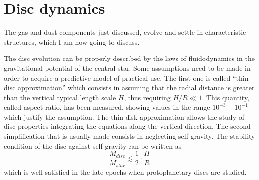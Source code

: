 \documentclass[a4paper,10pt]{report}
\begin{document}
\section{Disc dynamics}

The gas and dust components just discussed, 
evolve and settle in characteristic structures, which I am now going to discuss.

The disc evolution can be properly described by the laws of fluidodynamics in the gravitational potential of the central star.
Some assumptions need to be made in order to acquire a predictive model of practical use.
The first one is called ``thin-disc approximation'' which consists in assuming that the radial distance is greater than 
the vertical typical length scale $H$, thus requiring $H/R \ll 1$. This quantity, called aspect-ratio, has been measured, 
showing values in the range $10^{-3}-10^{-1}$ which justify the assumption. The thin disk approximation allows the study of disc properties integrating
the equations along the vertical direction.
The second simplification that is usually made consists in neglecting self-gravity.
The stability condition of the disc against self-gravity can be written \cite[p. 40]{book_planet_form} as
\begin{equation}
    \frac{M_{disc}}{M_{star}} \lesssim  \frac{1}{2}\cdot \frac{H}{R}
\end{equation}
which is well satisfied in the late epochs when protoplanetary discs are studied.
\end{document}
